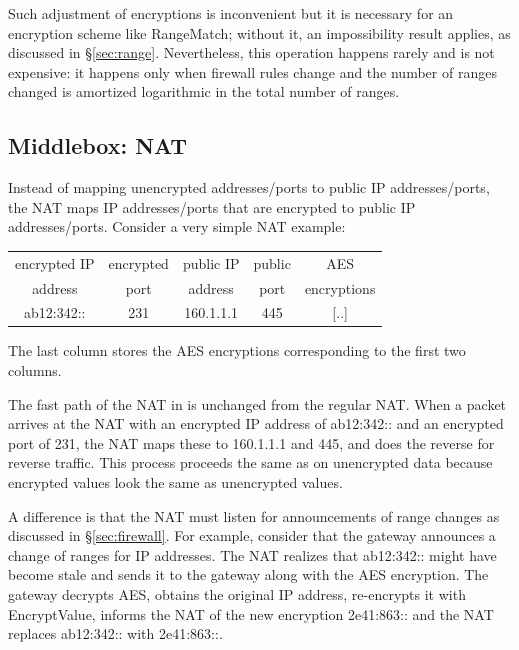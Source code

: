 Such adjustment of encryptions is inconvenient but it is  necessary for an encryption scheme like RangeMatch; without it, an impossibility result applies, as discussed in \S\ref{sec:range}. Nevertheless, this operation happens rarely and is not expensive: it happens only when firewall rules change and the number of ranges changed is  amortized logarithmic in the total number of ranges. 
 



\subsection{Middlebox: NAT}\label{sec:nat}



Instead of mapping unencrypted addresses/ports to public IP addresses/ports, the NAT maps IP addresses/ports that are encrypted to public IP addresses/ports. 
Consider a very simple NAT example:

\smallskip
\small
\noindent
\begin{tabular}{c|c|c|c|c}
encrypted IP   & encrypted  &  public IP   & public  &  AES   \\
address           & port            &   address   &  port    & encryptions \\
\hline
ab12:342::               & 231                  & 160.1.1.1  &  445 &  [..] \\ 
\end{tabular}
\normalsize
\smallskip

The last column stores the AES encryptions corresponding to the first two columns. 

The fast path of the NAT in \sys{} is unchanged from the regular NAT. 
When a packet arrives at the NAT with an encrypted   IP address of ab12:342:: and an encrypted port of 231, the NAT maps these to 160.1.1.1 and 445, and does the reverse for reverse traffic. 
This process proceeds the same as on unencrypted data because encrypted values look the same as unencrypted values. 


A difference is that the NAT must listen for announcements of range changes as discussed in \S\ref{sec:firewall}.
For example, consider that the gateway announces a change of ranges for IP addresses.
The NAT realizes that ab12:342:: might have become stale and sends it to the gateway along with the AES encryption. The gateway decrypts AES, obtains the original IP address, re-encrypts it with EncryptValue, informs the NAT of the new encryption 2e41:863:: and the NAT replaces  ab12:342:: with 2e41:863::.

